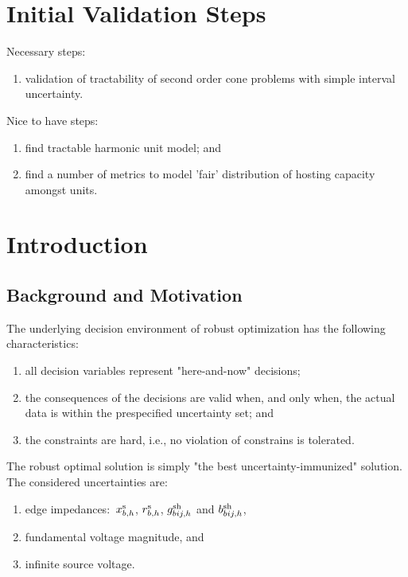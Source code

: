 \section{Initial Validation Steps}

Necessary steps:
\begin{enumerate}
    \item validation of tractability of second order cone problems with simple interval uncertainty.
\end{enumerate}

Nice to have steps:
\begin{enumerate}
    \item find tractable harmonic unit model; and
    \item find a number of metrics to model 'fair' distribution of hosting capacity amongst units.
\end{enumerate}

\section{Introduction}
\label{sec:introduction}

\subsection{Background and Motivation}
\label{sec:background_and_motivation}

The underlying decision environment of robust optimization has the following characteristics:
\begin{enumerate}
    \item all decision variables represent "here-and-now" decisions;
    \item the consequences of the decisions are valid when, and only when, the actual data is within the prespecified uncertainty set; and
    \item the constraints are hard, i.e., no violation of constrains is tolerated.
\end{enumerate}

The robust optimal solution is simply "the best uncertainty-immunized" solution. The considered uncertainties are:
\begin{enumerate}
    \item edge impedances:~$x_{b,h}^{\text{s}}$, $r_{b,h}^{\text{s}}$, $g_{bij,h}^{\text{sh}}$ and $b_{bij,h}^{\text{sh}}$,
    \item fundamental voltage magnitude, and
    \item infinite source voltage.
\end{enumerate}

